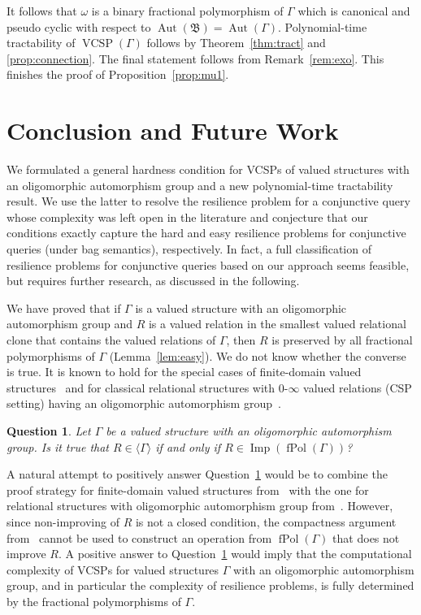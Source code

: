 \documentclass[nonacm]{acmart}
\newcommand{\bB}{{\mathfrak B}}
\DeclareMathOperator{\Imp}{Imp}
\DeclareMathOperator{\Aut}{Aut}
\DeclareMathOperator{\fPol}{fPol}
\DeclareMathOperator{\VCSP}{VCSP}
\newtheorem{question}[theorem]{Question}
\begin{document}
It follows that $\omega$ is a binary fractional polymorphism of $\Gamma$ which is canonical and pseudo cyclic with respect to $\Aut(\bB)= \Aut(\Gamma)$. Polynomial-time tractability of $\VCSP(\Gamma)$ follows 
 by Theorem~\ref{thm:tract}
 and \ref{prop:connection}. 
 The final statement follows from Remark~\ref{rem:exo}. This finishes the proof of Proposition~\ref{prop:mu1}.


\section{Conclusion and Future Work}
\label{sect:concl}

We formulated a general hardness condition for VCSPs of valued structures with an oligomorphic automorphism group and  a new  polynomial-time tractability result. We use the latter to 
resolve the resilience problem for a conjunctive query whose complexity was left open in the literature and conjecture that our conditions exactly capture
the hard and easy resilience problems for conjunctive queries (under bag semantics), respectively. In fact, a full classification of resilience problems for conjunctive queries based on our approach seems feasible, but requires further research, as discussed in the following.

We have proved that if $\Gamma$ is a valued structure with an oligomorphic automorphism group and $R$ is a valued relation in the smallest valued relational clone that contains the valued relations of $\Gamma$, then
$R$ is preserved by all fractional polymorphisms of $\Gamma$ (Lemma~\ref{lem:easy}). We do not know whether the converse is true. It is known to hold for 
the special cases
of finite-domain valued structures~\cite{CohenCooperJeavonsVCSP,FullaZivny}
and for classical relational structures with $0$-$\infty$ valued relations (CSP setting) having an oligomorphic automorphism group~\cite{BodirskyNesetril}.

\begin{question}\label{ques:pres}
    Let $\Gamma$ be a valued structure with an oligomorphic automorphism group. Is it true that $R \in \langle \Gamma \rangle$ if and only if $R \in \Imp(\fPol(\Gamma))$? 
\end{question}

A natural attempt to positively answer Question~\ref{ques:pres} would be to combine the proof strategy for finite-domain valued structures from~\cite{CohenCooperJeavonsVCSP,FullaZivny}
with the one for relational structures with oligomorphic automorphism group from~\cite{BodirskyNesetril}. However, since non-improving of $R$ is not a closed condition, 
the compactness argument from~\cite{BodirskyNesetril} cannot be used to construct an operation from $\fPol(\Gamma)$ that does not improve $R$.
A positive answer to Question~\ref{ques:pres} would imply that the computational complexity of VCSPs for valued structures $\Gamma$ with an oligomorphic automorphism group, and in particular the complexity of resilience problems, is fully determined by the fractional polymorphisms of $\Gamma$.
\end{document}
